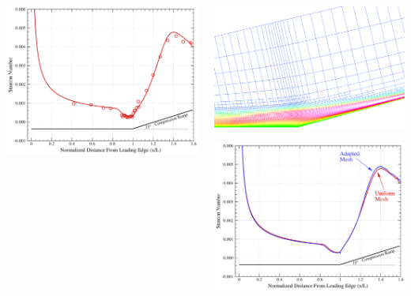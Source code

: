 \documentclass[compress,11pt]{beamer}
\begin{document}
{\begin{columns}[t]
\begin{center}
	\includegraphics[width=.8\textwidth]{figures/holden_ramp/stanton}
      \end{center}      
      \begin{center}
	\includegraphics[width=\textwidth]{figures/holden_ramp/amr} \vspace{.5em}
	
	\includegraphics[width=.92\textwidth]{figures/holden_ramp/amr_st_comp}	
      \end{center}
  \end{columns}
}
\end{document}
